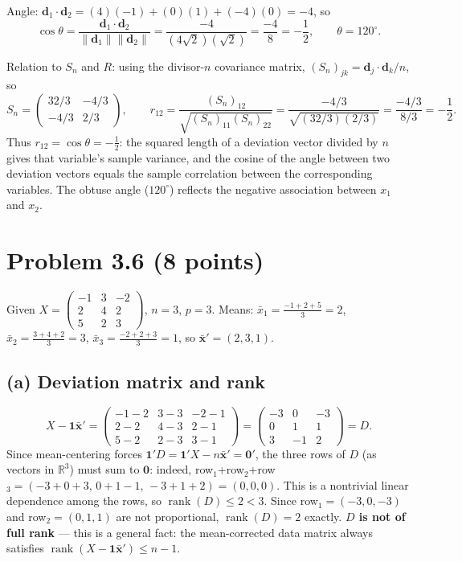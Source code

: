 \documentclass[11pt]{article}
\begin{document}
Angle: $\bm d_1\cdot\bm d_2=(4)(-1)+(0)(1)+(-4)(0)=-4$, so
\[
\cos\theta=\frac{\bm d_1\cdot\bm d_2}{\|\bm d_1\|\|\bm d_2\|}=\frac{-4}{(4\sqrt2)(\sqrt2)}=\frac{-4}{8}=-\frac12, \qquad \theta=120^\circ.
\]

Relation to $S_n$ and $R$: using the divisor-$n$ covariance matrix, $(S_n)_{jk}=\bm d_j\cdot\bm d_k/n$, so
\[
S_n=\begin{pmatrix}32/3 & -4/3\\ -4/3 & 2/3\end{pmatrix}, \qquad r_{12}=\frac{(S_n)_{12}}{\sqrt{(S_n)_{11}(S_n)_{22}}}=\frac{-4/3}{\sqrt{(32/3)(2/3)}}=\frac{-4/3}{8/3}=-\frac12.
\]
Thus $r_{12}=\cos\theta=-\tfrac12$: the squared length of a deviation vector divided by $n$ gives that variable's sample variance, and the cosine of the angle between two deviation vectors equals the sample correlation between the corresponding variables. The obtuse angle ($120^\circ$) reflects the negative association between $x_1$ and $x_2$.

\newpage
\section*{Problem 3.6 (8 points)}

\noindent Given $X=\begin{pmatrix}-1 & 3 & -2\\ 2 & 4 & 2\\ 5 & 2 & 3\end{pmatrix}$, $n=3$, $p=3$. Means: $\bar x_1=\frac{-1+2+5}{3}=2$, $\bar x_2=\frac{3+4+2}{3}=3$, $\bar x_3=\frac{-2+2+3}{3}=1$, so $\bar{\bm x}'=(2,3,1)$.

\subsection*{(a) Deviation matrix and rank}
\[
X-\bm 1\bar{\bm x}'=\begin{pmatrix}-1-2 & 3-3 & -2-1\\ 2-2 & 4-3 & 2-1\\ 5-2 & 2-3 & 3-1\end{pmatrix}=\begin{pmatrix}-3 & 0 & -3\\ 0 & 1 & 1\\ 3 & -1 & 2\end{pmatrix}=D.
\]
Since mean-centering forces $\bm 1'D=\bm 1'X-n\bar{\bm x}'=\bm 0'$, the three rows of $D$ (as vectors in $\mathbb{R}^3$) must sum to $\bm 0$: indeed, row$_1$+row$_2$+row$_3=(-3+0+3,\,0+1-1,\,-3+1+2)=(0,0,0)$. This is a nontrivial linear dependence among the rows, so $\operatorname{rank}(D)\le 2<3$. Since row$_1=(-3,0,-3)$ and row$_2=(0,1,1)$ are not proportional, $\operatorname{rank}(D)=2$ exactly. \textbf{$D$ is not of full rank} — this is a general fact: the mean-corrected data matrix always satisfies $\operatorname{rank}(X-\bm 1\bar{\bm x}')\le n-1$.
\end{document}
